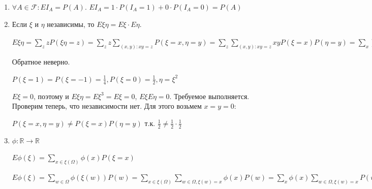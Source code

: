 \begin{enumerate}
    Т.к. это квадратный трехчлен от $t$, который всегда не меньше 0, то для его дискриминанта верно $(2E\xi\eta)^2 - 4E\xi^2E\eta^2 \leq 0$. Отсюда следует исходное неравенство.
    
    Анализируем, когда достигается равенство:
    
    \begin{enumerate}
        \item Вырожденный. Тогда $E\xi^2 = 0$, т.е. $\sum\limits_{w \in \Omega}\xi(w)^2P(w) = 0$, значит, $P(\xi = 0) = 1$.
        
        \Def $\xi \stackrel{\mbox{п.н.}}{=} 0$, если $P(\xi = 0) = 1$.
        
        Тогда $\xi + 0 \cdot \eta \stackrel{\mbox{п.н.}}{=} 0$
        
        \item $\exists t : E(t\xi - \eta)^2 = 0$, тогда $t\xi - \eta \stackrel{\mbox{п.н.}}{=} 0$.
    \end{enumerate}
    \EndProof
    
    \item $\forall A \in \mathcal{F} : EI_A = P(A)$.
    \Proof
    $EI_A = 1 \cdot P(I_A = 1) + 0 \cdot P(I_A = 0) = P(A)$    
    \EndProof
    
    \item Если $\xi$ и $\eta$ независимы, то $E\xi\eta = E\xi \cdot E\eta$.
    
    \Proof
    $E\xi\eta = \sum\limits_zzP(\xi\eta = z) = \sum\limits_zz\sum\limits_{(x, y) : xy = z}P(\xi = x, \eta = y) = \sum\limits_z\sum\limits_{(x, y) : xy = z}xyP(\xi = x)P(\eta = y) = \sum\limits_x\sum\limits_yxyP(\xi = x)P(\eta = y) = (\sum\limits_xxP(\xi = x))(\sum\limits_yyP(\eta = y))$
    \EndProof
    
    \Note Обратное неверно. 
    
    \Example $P(\xi = 1) = P(\xi = -1) = \frac{1}{4}, P(\xi = 0) = \frac{1}{2}, \eta = \xi^2$
    
    $E\xi = 0$, поэтому и $E\xi\eta = E\xi^3 = E\xi = 0$, $E\xi E\eta = 0$. Требуемое выполняется. Проверим теперь, что независимости нет. Для этого возьмем $x = y = 0$:
    
    $P(\xi = x, \eta = y) \neq P(\xi = x)P(\eta = y)$ т.к. $\frac{1}{2} \neq \frac{1}{2} \cdot \frac{1}{2}$
    
    \item $\phi : \mathbb{R} \to \mathbb{R}$
    
    $E\phi(\xi) = \sum\limits_{x \in \xi(\Omega)}\phi(x)P(\xi = x)$
    
    \Proof
    $E\phi(\xi) = \sum\limits_{w \in \Omega}\phi(\xi(w))P(w) = \sum\limits_{x \in \xi(\Omega)}\sum\limits_{w \in \Omega, \xi(w) = x}\phi(x)P(w) = \sum\limits_x\phi(x)\sum\limits_{w \in \Omega, \xi(w) = x}P(w) = \sum\limits_x\phi(x)P(\xi = x)$    
    \EndProof
\end{enumerate}


